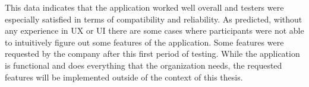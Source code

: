 This data indicates that the application worked well overall and testers 
were especially satisfied in terms of compatibility and reliability. 
As predicted, without any experience in UX or UI there are some cases where participants were not able to intuitively figure out some features of the application. 
Some features were requested by the company after this first period of testing. 
While the application is functional and does everything that the organization needs, 
the requested features will be implemented outside of the context of this thesis. 
